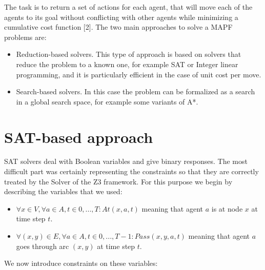 \documentclass[12pt, a4paper, hidelinks]{article}
\begin{document}
The task is to return a set of actions for each agent, that will move each of the agents to its goal without conflicting with other agents while minimizing a cumulative cost function [2]. The two main approaches to solve a MAPF problems are:

\begin{itemize}
\item Reduction-based solvers. This type of approach is based on solvers that reduce the problem to a known one, for example SAT or Integer linear programming, and it is particularly efficient in the case of unit cost per move. 
\item Search-based solvers. In this case the problem can be formalized as a search in a global search space, for example some variants of A*.
\end{itemize}

\section{SAT-based approach}
SAT solvers deal with Boolean variables and give binary responses. The most difficult part was certainly representing the constraints so that they are correctly treated by the Solver of the Z3 framework. For this purpose we begin by describing the variables that we used:

\begin{itemize}
\item $\forall x \in V, \forall a \in A, t \in {0, ..., T} : At(x, a, t)$ meaning that agent $a$ is at node $x$ at time step $t$.
\item $\forall(x, y)\in E, \forall a \in A, t \in {0, ..., T-1} : Pass(x, y, a, t)$ meaning that agent $a$ goes through arc $(x, y)$ at time step $t$. 
\end{itemize}

We now introduce constraints on these variables:
\end{document}
